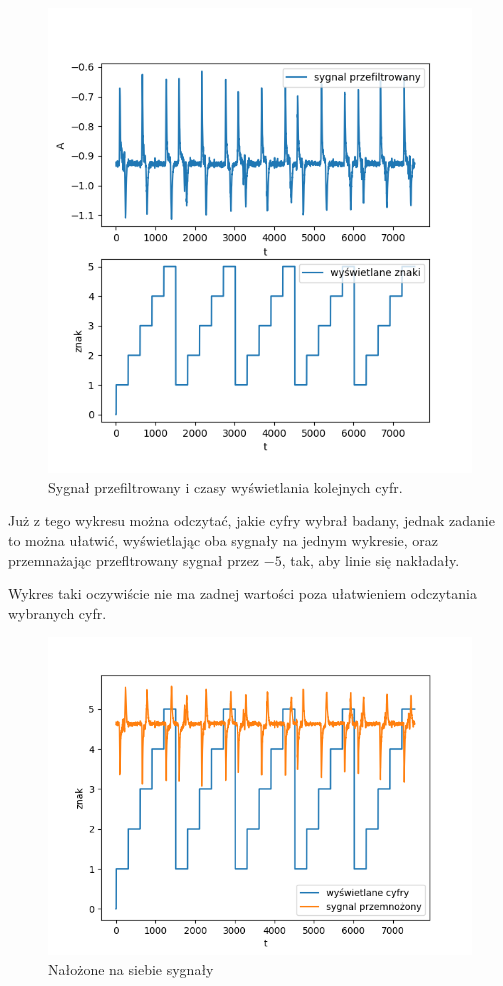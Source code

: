\documentclass[licencjacka]{kdypl}
\begin{document}
\begin{figure}[H]
		\centering
		\includegraphics[scale=0.8]{sygCyf.PNG}
		\caption{Sygnał przefiltrowany i czasy wyświetlania kolejnych cyfr.}
		\end{figure}
		
Już z tego wykresu można odczytać, jakie cyfry wybrał badany, jednak zadanie to można ułatwić, wyświetlając oba sygnały na jednym wykresie, oraz przemnażając przefltrowany sygnał przez $-5$, tak, aby linie się nakładały.

Wykres taki oczywiście nie ma zadnej wartości poza ułatwieniem odczytania wybranych cyfr.

\begin{figure}[H]
		\centering
		\includegraphics[scale=0.8]{combo.PNG}
		\caption{Nałożone na siebie sygnały}
		\end{figure}
		
\end{document}
